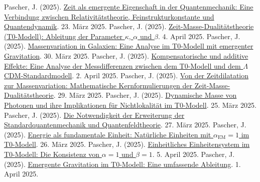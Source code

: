 \documentclass[a4paper,12pt]{article}
\newcommand{\alphaEM}{\alpha_{\text{EM}}}
\begin{document}
	\begin{thebibliography}{99}
		 Pascher, J. (2025). \href{https://github.com/jpascher/T0-Time-Mass-Duality/tree/main/2/pdf/Deutsch/ZeitEmergentQM.pdf}{Zeit als emergente Eigenschaft in der Quantenmechanik: Eine Verbindung zwischen Relativitätstheorie, Feinstrukturkonstante und Quantendynamik}. 23. März 2025.
		 Pascher, J. (2025). \href{https://github.com/jpascher/T0-Time-Mass-Duality/tree/main/2/pdf/Deutsch/ZeitMasseT0Params.pdf}{Zeit-Masse-Dualitätstheorie (T0-Modell): Ableitung der Parameter \(\kappa\), \(\alpha\) und \(\beta\)}. 4. April 2025.
		 Pascher, J. (2025). \href{https://github.com/jpascher/T0-Time-Mass-Duality/tree/main/2/pdf/Deutsch/MassVarGalaxien.pdf}{Massenvariation in Galaxien: Eine Analyse im T0-Modell mit emergenter Gravitation}. 30. März 2025.
		 Pascher, J. (2025). \href{https://github.com/jpascher/T0-Time-Mass-Duality/tree/main/2/pdf/Deutsch/MessdifferenzenT0Standard.pdf}{Kompensatorische und additive Effekte: Eine Analyse der Messdifferenzen zwischen dem T0-Modell und dem \(\Lambda\)CDM-Standardmodell}. 2. April 2025.
		 Pascher, J. (2025). \href{https://github.com/jpascher/T0-Time-Mass-Duality/tree/main/2/pdf/Deutsch/MathZeitMasseLagrange.pdf}{Von der Zeitdilatation zur Massenvariation: Mathematische Kernformulierungen der Zeit-Masse-Dualitätstheorie}. 29. März 2025.
		 Pascher, J. (2025). \href{https://github.com/jpascher/T0-Time-Mass-Duality/tree/main/2/pdf/Deutsch/DynMassePhotonenNichtlokal.pdf}{Dynamische Masse von Photonen und ihre Implikationen für Nichtlokalität im T0-Modell}. 25. März 2025.
		 Pascher, J. (2025). \href{https://github.com/jpascher/T0-Time-Mass-Duality/tree/main/2/pdf/Deutsch/NotwendigkeitQMErweiterung.pdf}{Die Notwendigkeit der Erweiterung der Standardquantenmechanik und Quantenfeldtheorie}. 27. März 2025.
		 Pascher, J. (2025). \href{https://github.com/jpascher/T0-Time-Mass-Duality/tree/main/2/pdf/Deutsch/NatEinheitenAlpha1.pdf}{Energie als fundamentale Einheit: Natürliche Einheiten mit \(\alphaEM = 1\) im T0-Modell}. 26. März 2025.
		 Pascher, J. (2025). \href{https://github.com/jpascher/T0-Time-Mass-Duality/tree/main/2/pdf/Deutsch/Alpha1Beta1Konsistenz.pdf}{Einheitliches Einheitensystem im T0-Modell: Die Konsistenz von \(\alpha = 1\) und \(\beta = 1\)}. 5. April 2025.
		 Pascher, J. (2025). \href{https://github.com/jpascher/T0-Time-Mass-Duality/tree/main/2/pdf/Deutsch/EmergentGravT0.pdf}{Emergente Gravitation im T0-Modell: Eine umfassende Ableitung}. 1. April 2025.

\end{thebibliography}
\end{document}
